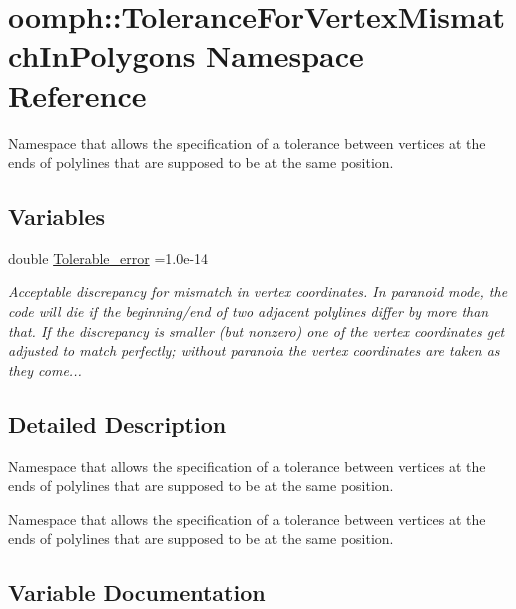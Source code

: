 \hypertarget{namespaceoomph_1_1ToleranceForVertexMismatchInPolygons}{}\section{oomph\+:\+:Tolerance\+For\+Vertex\+Mismatch\+In\+Polygons Namespace Reference}
\label{namespaceoomph_1_1ToleranceForVertexMismatchInPolygons}


Namespace that allows the specification of a tolerance between vertices at the ends of polylines that are supposed to be at the same position.  


\subsection*{Variables}
\begin{DoxyCompactItemize}
\item 
double \hyperlink{namespaceoomph_1_1ToleranceForVertexMismatchInPolygons_ae1a92a97c2133c8cdc5172dea3c1e896}{Tolerable\+\_\+error} =1.\+0e-\/14
\begin{DoxyCompactList}\small\item\em Acceptable discrepancy for mismatch in vertex coordinates. In paranoid mode, the code will die if the beginning/end of two adjacent polylines differ by more than that. If the discrepancy is smaller (but nonzero) one of the vertex coordinates get adjusted to match perfectly; without paranoia the vertex coordinates are taken as they come... \end{DoxyCompactList}\end{DoxyCompactItemize}


\subsection{Detailed Description}
Namespace that allows the specification of a tolerance between vertices at the ends of polylines that are supposed to be at the same position. 

Namespace that allows the specification of a tolerance between vertices at the ends of polylines that are supposed to be at the same position. 

\subsection{Variable Documentation}
\mbox{\label{namespaceoomph_1_1ToleranceForVertexMismatchInPolygons_ae1a92a97c2133c8cdc5172dea3c1e896}} 
